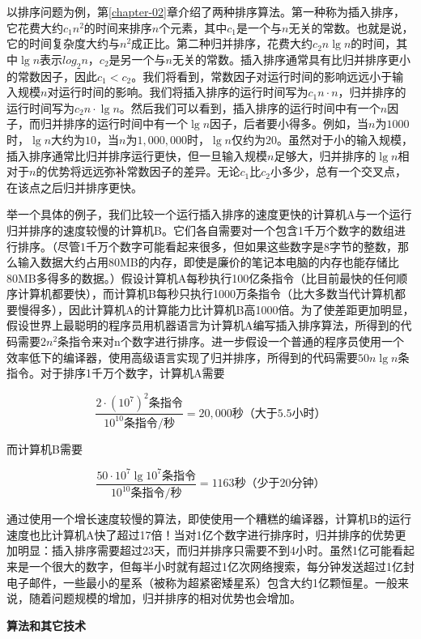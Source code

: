 \documentclass[lang=cn,newtx,10pt,scheme=chinese]{elegantbook}
\begin{document}
以排序问题为例，第\ref{chapter-02}章介绍了两种排序算法。第一种称为插入排序，它花费大约$c_1n^2$的时间来排序$n$个元素，其中$c_1$是一个与$n$无关的常数。也就是说，它的时间复杂度大约与$n^2$成正比。第二种归并排序，花费大约$c_2n\lg n$的时间，其中$\lg n$表示$log_2n$，$c_2$是另一个与$n$无关的常数。插入排序通常具有比归并排序更小的常数因子，因此$c_1 < c_2$。我们将看到，常数因子对运行时间的影响远远小于输入规模$n$对运行时间的影响。我们将插入排序的运行时间写为$c_1n \cdot n$，归并排序的运行时间写为$c_2n \cdot \lg n$。然后我们可以看到，插入排序的运行时间中有一个$n$因子，而归并排序的运行时间中有一个$\lg n$因子，后者要小得多。例如，当$n$为$1000$时，$\lg n$大约为$10$，当$n$为$1,000,000$时，$\lg n$仅约为$20$。虽然对于小的输入规模，插入排序通常比归并排序运行更快，但一旦输入规模$n$足够大，归并排序的$\lg n$相对于$n$的优势将远远弥补常数因子的差异。无论$c_1$比$c_2$小多少，总有一个交叉点，在该点之后归并排序更快。

举一个具体的例子，我们比较一个运行插入排序的速度更快的计算机A与一个运行归并排序的速度较慢的计算机B。它们各自需要对一个包含1千万个数字的数组进行排序。（尽管1千万个数字可能看起来很多，但如果这些数字是8字节的整数，那么输入数据大约占用80MB的内存，即使是廉价的笔记本电脑的内存也能存储比80MB多得多的数据。）假设计算机A每秒执行100亿条指令（比目前最快的任何顺序计算机都要快），而计算机B每秒只执行1000万条指令（比大多数当代计算机都要慢得多），因此计算机A的计算能力比计算机B高1000倍。为了使差距更加明显，假设世界上最聪明的程序员用机器语言为计算机A编写插入排序算法，所得到的代码需要$2n^2$条指令来对n个数字进行排序。进一步假设一个普通的程序员使用一个效率低下的编译器，使用高级语言实现了归并排序，所得到的代码需要$50n\lg n$条指令。对于排序1千万个数字，计算机A需要

$$
\frac{2\cdot (10^7)^2\text{条指令}}{10^{10}\text{条指令}/\text{秒}}
=
20,000\text{秒（大于5.5小时）}
$$

而计算机B需要

$$
\frac{50\cdot 10^7\lg 10^7\text{条指令}}{10^{10}\text{条指令}/\text{秒}}
=
1163\text{秒（少于20分钟）}
$$

通过使用一个增长速度较慢的算法，即使使用一个糟糕的编译器，计算机B的运行速度也比计算机A快了超过17倍！当对1亿个数字进行排序时，归并排序的优势更加明显：插入排序需要超过23天，而归并排序只需要不到4小时。虽然1亿可能看起来是一个很大的数字，但每半小时就有超过1亿次网络搜索，每分钟发送超过1亿封电子邮件，一些最小的星系（被称为超紧密矮星系）包含大约1亿颗恒星。一般来说，随着问题规模的增加，归并排序的相对优势也会增加。

\textbf{算法和其它技术}
\end{document}
